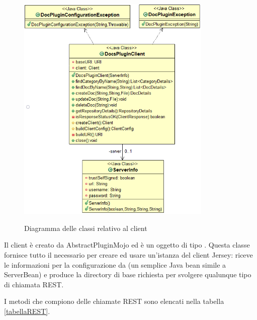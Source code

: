\begin{figure}[H]
    \centering
    \includegraphics[width=0.83\textwidth]{immagini/client.png}\\
    \caption{Diagramma delle classi relativo al client}
\end{figure}

Il client è creato da AbstractPluginMojo ed è un oggetto di tipo .
Questa classe fornisce tutto il necessario per creare ed usare un'istanza del client Jersey: riceve le informazioni per la configurazione da  (un semplice Java bean simile a ServerBean) e produce la directory di base richiesta per svolgere qualunque tipo di chiamata REST.

I metodi che compiono delle chiamate REST sono elencati nella tabella \ref{tabellaREST}.

